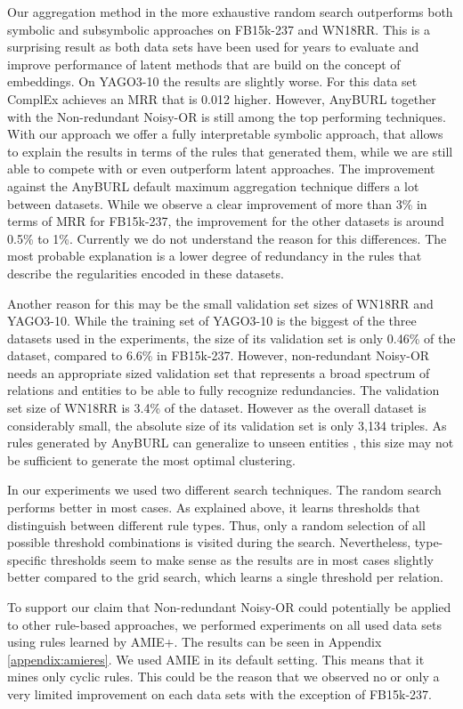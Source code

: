 \documentclass[akbc,twoside,11pt,lettersize]{article}
\begin{document}
Our aggregation method in the more exhaustive random search outperforms both symbolic and subsymbolic approaches on FB15k-237 and WN18RR. This is a surprising result as both data sets have been used for years to evaluate and improve performance of latent methods that are build on the concept of embeddings. On YAGO3-10 the results are slightly worse. For this data set ComplEx achieves an MRR that is 0.012 higher. However, AnyBURL together with the Non-redundant Noisy-OR is still among the top performing techniques. With our approach we offer a fully interpretable symbolic approach, that allows to explain the results in terms of the rules that generated them, while we are still able to compete with or even outperform latent approaches. The improvement against the AnyBURL default maximum aggregation technique differs a lot between datasets. While we observe a clear improvement of more than 3\% in terms of MRR for FB15k-237, the improvement for the other datasets is around 0.5\% to 1\%. Currently we do not understand the reason for this differences. The most probable explanation is a lower degree of redundancy in the rules that describe the regularities encoded in these datasets.

Another reason for this may be the small validation set sizes of WN18RR and YAGO3-10. While the training set of YAGO3-10 is the biggest of the three datasets used in the experiments, the size of its validation set is only 0.46\% of the dataset, compared to 6.6\% in FB15k-237. However, non-redundant Noisy-OR needs an appropriate sized validation set that represents a broad spectrum of relations and entities to be able to fully recognize redundancies. The validation set size of WN18RR is 3.4\% of the dataset. However as the overall dataset is considerably small, the absolute size of its validation set is only 3,134 triples. As rules generated by AnyBURL can generalize to unseen entities \cite{Ferre2020}, this size may not be sufficient to generate the most optimal clustering.

In our experiments we used two different search techniques. The random search performs better in most cases. As explained above, it learns thresholds that distinguish between different rule types. Thus, only a random selection of all possible threshold combinations is visited during the search. Nevertheless, type-specific thresholds seem to make sense as the results are in most cases slightly better compared to the grid search, which learns a single threshold per relation.

To support our claim that Non-redundant Noisy-OR could potentially be applied to other rule-based approaches, we performed experiments on all used data sets using rules learned by AMIE+. The results can be seen in Appendix \ref{appendix:amieres}. We used AMIE in its default setting. This means that it mines only cyclic rules. This could be the reason that we observed no or only a very limited improvement on each data sets with the exception of FB15k-237. 
\end{document}
